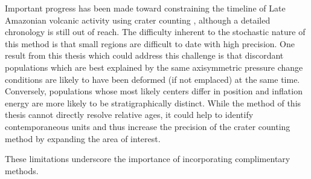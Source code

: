 Important progress has been made toward constraining the timeline of Late Amazonian volcanic activity using crater counting \parencite{kneissl_map-projection-independent_2011,robbins_volcanic_2011,
robbins_large_2013,
platz_crater-based_2013}, although a detailed chronology is still out of reach. The difficulty inherent to the stochastic nature of this method is that small regions are difficult to date with high precision. One result from this thesis which could address this challenge is that discordant populations which are best explained by the same axisymmetric pressure change conditions are likely to have been deformed (if not emplaced) at the same time. Conversely, populations whose most likely centers differ in position and inflation energy are more likely to be stratigraphically distinct. While the method of this thesis cannot directly resolve relative ages, it could help to identify contemporaneous units and thus increase the precision of the crater counting method by expanding the area of interest.

These limitations underscore the importance of incorporating complimentary methods.